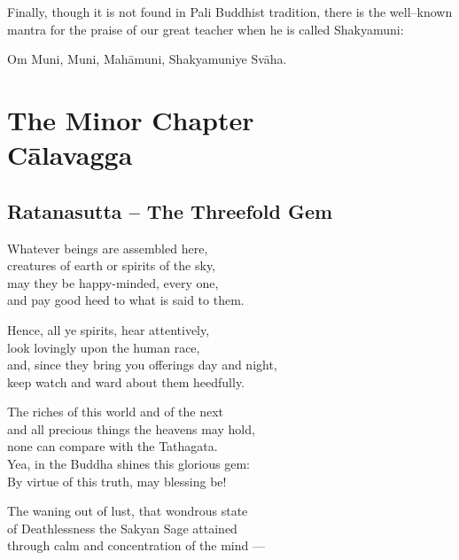 Finally, though it is not found in Pali Buddhist tradition, there is the well--known mantra for the praise of our great teacher when he is called Shakyamuni:

\begin{MyDescription}[]{}
Om Muni, Muni, Mah\=amuni, Shakyamuniye Sv\=aha.
\end{MyDescription}

\part{The Minor Chapter \\ C\={a}lavagga}

\chapter{Ratanasutta -- The Threefold Gem}
\begin{MyDescription}{}
Whatever beings are assembled here,\\
creatures of earth or spirits of the sky,\\
may they be happy-minded, every one,\\
and pay good heed to what is said to them.
\end{MyDescription}

\begin{MyDescription}{}
Hence, all ye spirits, hear attentively,\\
look lovingly upon the human race,\\
and, since they bring you offerings day and night,\\
keep watch and ward about them heedfully.
\end{MyDescription}

\begin{MyDescription}{}
The riches of this world and of the next\\
and all precious things the heavens may hold,\\
none can compare with the Tathagata.\\
Yea, in the Buddha shines this glorious gem:\\
By virtue of this truth, may blessing be!
\end{MyDescription}

\begin{MyDescription}{}
The waning out of lust, that wondrous state\\
of Deathlessness the Sakyan Sage attained\\
through calm and concentration of the mind —
\end{MyDescription}

